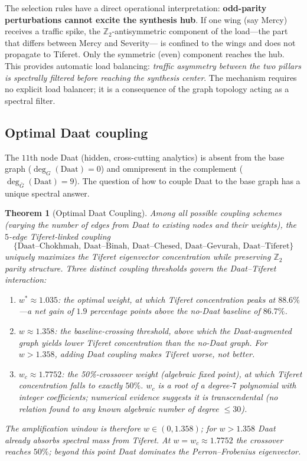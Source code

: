 \documentclass[11pt,a4paper]{amsart}
\newtheorem{theorem}{Theorem}[section]
\theoremstyle{remark}
\newcommand{\bbZ}{\mathbb{Z}}
\begin{document}
The selection rules have a direct operational interpretation:
\textbf{odd-parity perturbations cannot excite the synthesis hub}. If one
wing (say Mercy) receives a traffic spike, the $\bbZ_2$-antisymmetric
component of the load---the part that differs between Mercy and Severity---
is confined to the wings and does not propagate to Tiferet. Only the
symmetric (even) component reaches the hub. This provides automatic load
balancing: \emph{traffic asymmetry between the two pillars is spectrally
filtered before reaching the synthesis center}. The mechanism requires no
explicit load balancer; it is a consequence of the graph topology acting
as a spectral filter.

\subsection{Optimal Daat coupling}
\label{sec:daat}

The $11$th node Daat (hidden, cross-cutting analytics) is absent from the
base graph ($\deg_G(\text{Daat}) = 0$) and omnipresent in the complement
($\deg_{\bar{G}}(\text{Daat}) = 9$). The question of how to couple Daat to
the base graph has a unique spectral answer.

\begin{theorem}[Optimal Daat Coupling]
\label{thm:daat}
Among all possible coupling schemes (varying the number of edges from Daat
to existing nodes and their weights), the $5$-edge Tiferet-linked coupling
\begin{equation}
\{\text{Daat--Chokhmah, Daat--Binah, Daat--Chesed, Daat--Gevurah, Daat--Tiferet}\}
\end{equation}
uniquely maximizes the Tiferet eigenvector concentration while preserving
$\bbZ_2$ parity structure. Three distinct coupling thresholds govern the
Daat--Tiferet interaction:
\begin{enumerate}[leftmargin=*,label=\textup{(\roman*)}]
\item $w^* \approx 1.035$: the \emph{optimal weight}, at which Tiferet
  concentration peaks at $88.6\%$---a net gain of $1.9$ percentage points
  above the no-Daat baseline of $86.7\%$.
\item $w \approx 1.358$: the \emph{baseline-crossing threshold}, above which
  the Daat-augmented graph yields \emph{lower} Tiferet concentration than
  the no-Daat graph. For $w > 1.358$, adding Daat coupling makes Tiferet
  worse, not better.
\item $w_c \approx 1.7752$: the \emph{50\%-crossover weight} (algebraic fixed
  point), at which Tiferet concentration falls to exactly $50\%$. $w_c$ is
  a root of a degree-$7$ polynomial with integer coefficients; numerical
  evidence suggests it is transcendental (no relation found to any known
  algebraic number of degree $\le 30$).
\end{enumerate}
The amplification window is therefore $w \in (0, 1.358)$; for $w > 1.358$
Daat already absorbs spectral mass from Tiferet. At $w = w_c \approx 1.7752$
the crossover reaches $50\%$; beyond this point Daat dominates the
Perron--Frobenius eigenvector.
\end{theorem}
\end{document}
